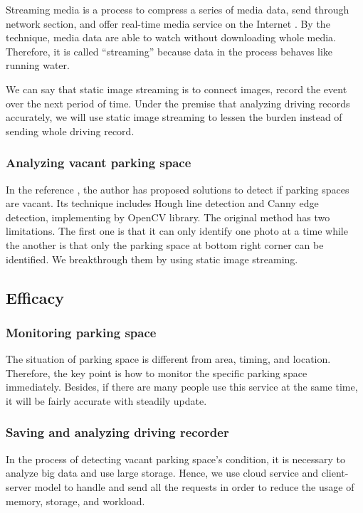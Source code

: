 \documentclass[preprint,12pt]{elsarticle}
\begin{document}
Streaming media is a process to compress a series of media data, send
through network section, and offer real-time media service on the
Internet \cite{IOV2014}. By the technique, media data are able to watch without
downloading whole media. Therefore, it is called ``streaming'' because
data in the process behaves like running water.

We can say that static image streaming is to connect images,
record the event over the next period of time. Under the premise that
analyzing driving records accurately, we will use static image streaming
to lessen the burden instead of sending whole driving record.

%
\subsubsection{Analyzing vacant parking space}
%

In the reference \cite{ParkingSpot}, the author has proposed solutions to detect if
parking spaces are vacant. Its technique includes Hough line detection
and Canny edge detection, implementing by OpenCV library. The
original method has two limitations. The first one is that it can only
identify one photo at a time while the another is that only the parking
space at bottom right corner can be identified. We breakthrough them by
using static image streaming.


%
\subsection{Efficacy}
%

%
\subsubsection{Monitoring parking space}
%

The situation of parking space is different from area, timing, and
location. Therefore, the key point is how to monitor the specific
parking space immediately. Besides, if there are many people use this
service at the same time, it will be fairly accurate with steadily
update.

%
\subsubsection{Saving and analyzing driving recorder}
%

In the process of detecting vacant parking space's condition, it is
necessary to analyze big data and use large storage. Hence, we use cloud
service and client-server model to handle and send all the requests in
order to reduce the usage of memory, storage, and workload.
\end{document}

